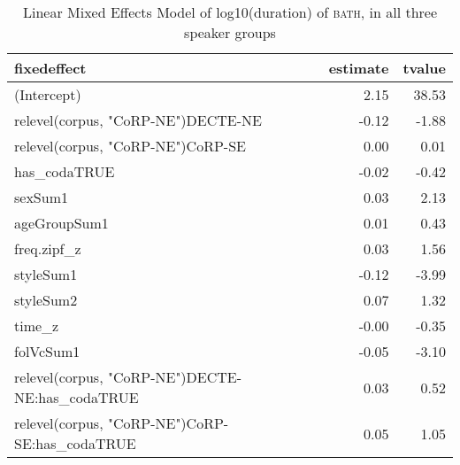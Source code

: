 \begin{table}[ht]
\centering
\begin{tabular}{lrr}
  \hline
fixedeffect & estimate & tvalue \\ 
  \hline
(Intercept) & 2.15 & 38.53 \\ 
  relevel(corpus, "CoRP-NE")DECTE-NE & -0.12 & -1.88 \\ 
  relevel(corpus, "CoRP-NE")CoRP-SE & 0.00 & 0.01 \\ 
  has\_codaTRUE & -0.02 & -0.42 \\ 
  sexSum1 & 0.03 & 2.13 \\ 
  ageGroupSum1 & 0.01 & 0.43 \\ 
  freq.zipf\_z & 0.03 & 1.56 \\ 
  styleSum1 & -0.12 & -3.99 \\ 
  styleSum2 & 0.07 & 1.32 \\ 
  time\_z & -0.00 & -0.35 \\ 
  folVcSum1 & -0.05 & -3.10 \\ 
  relevel(corpus, "CoRP-NE")DECTE-NE:has\_codaTRUE & 0.03 & 0.52 \\ 
  relevel(corpus, "CoRP-NE")CoRP-SE:has\_codaTRUE & 0.05 & 1.05 \\ 
   \hline
\end{tabular}
\caption{Linear Mixed Effects Model of log10(duration) of \textsc{bath}, in all three speaker groups \label{tbl:Blogdur}} 
\end{table}
